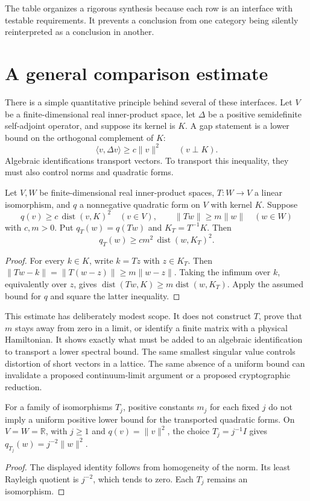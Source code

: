 The table organizes a rigorous synthesis because each row is an interface
with testable requirements. It prevents a conclusion from one category being
silently reinterpreted as a conclusion in another.

\section{A general comparison estimate}

There is a simple quantitative principle behind several of these interfaces.
Let $V$ be a finite-dimensional real inner-product space, let $\Delta$ be a
positive semidefinite self-adjoint operator, and suppose its kernel is $K$.
A gap statement is a lower bound on the orthogonal complement of $K$:
\[
 \langle v,\Delta v\rangle\geq c\|v\|^2\qquad(v\perp K).
\]
Algebraic identifications transport vectors. To transport this inequality,
they must also control norms and quadratic forms.

\begin{proposition}
Let $V,W$ be finite-dimensional real inner-product spaces, $T:W\to V$ a
linear isomorphism, and $q$ a nonnegative quadratic form on $V$ with kernel
$K$. Suppose
\[
 q(v)\geq c\,\operatorname{dist}(v,K)^2\quad(v\in V),
 \qquad \|Tw\|\geq m\|w\|\quad(w\in W)
\]
with $c,m>0$. Put $q_T(w)=q(Tw)$ and $K_T=T^{-1}K$. Then
\[
 q_T(w)\geq cm^2\,\operatorname{dist}(w,K_T)^2.
\]
\end{proposition}
\begin{proof}
For every $k\in K$, write $k=Tz$ with $z\in K_T$. Then
$\|Tw-k\|=\|T(w-z)\|\geq m\|w-z\|$. Taking the infimum over $k$, equivalently
over $z$, gives
$\operatorname{dist}(Tw,K)\geq m\operatorname{dist}(w,K_T)$.
Apply the assumed bound for $q$ and square the latter inequality.
\end{proof}

This estimate has deliberately modest scope. It does not construct $T$, prove
that $m$ stays away from zero in a limit, or identify a finite matrix with a
physical Hamiltonian. It shows exactly what must be added to an algebraic
identification to transport a lower spectral bound. The same smallest
singular value controls distortion of short vectors in a lattice. The same
absence of a uniform bound can invalidate a proposed continuum-limit argument
or a proposed cryptographic reduction.

\begin{corollary}
For a family of isomorphisms $T_j$, positive constants $m_j$ for each fixed
$j$ do not imply a uniform positive lower bound for the transported quadratic
forms. On $V=W=\mathbb R$, with $j\ge1$ and $q(v)=\|v\|^2$,
the choice $T_j=j^{-1}I$ gives
$q_{T_j}(w)=j^{-2}\|w\|^2$.
\end{corollary}
\begin{proof}
The displayed identity follows from homogeneity of the norm. Its least
Rayleigh quotient is $j^{-2}$, which tends to zero. Each $T_j$ remains an
isomorphism.
\end{proof}

